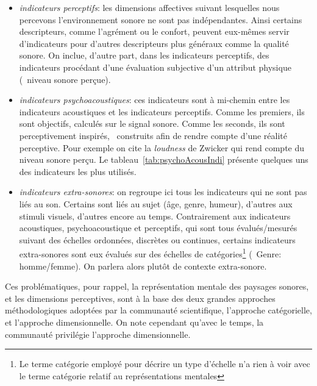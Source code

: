 \begin{itemize}
\begin{itemize}
\item \emph{indicateurs perceptifs}: les dimensions affectives suivant lesquelles nous percevons l'environnement sonore ne sont pas indépendantes. Ainsi certains descripteurs, comme l'agrément ou le confort, peuvent eux-mêmes servir d'indicateurs pour d'autres descripteurs plus généraux comme la qualité sonore. On inclue, d'autre part, dans les indicateurs perceptifs, des indicateurs procédant d'une évaluation subjective d'un attribut physique (\eg~niveau sonore perçue).

\item \emph{indicateurs psychoacoustiques}: ces indicateurs sont à mi-chemin entre les indicateurs acoustiques et les indicateurs perceptifs. Comme les premiers, ils sont objectifs, calculés sur le signal sonore. Comme les seconds, ils sont perceptivement inspirés, \ie~construits afin de rendre compte d'une réalité perceptive. Pour exemple on cite la \emph{loudness} de Zwicker \citep{zwicker2013psychoacoustics} qui rend compte du niveau sonore perçu. Le tableau~\ref{tab:psychoAcousIndi} présente quelques uns des indicateurs les plus utilisés.

\item \emph{indicateurs extra-sonores}: on regroupe ici tous les indicateurs qui ne sont pas liés au son. Certains sont liés au sujet (âge, genre, humeur), d'autres aux stimuli visuels, d'autres encore au temps. Contrairement aux indicateurs acoustiques, psychoacoustique et perceptifs, qui sont tous évalués/mesurés suivant des échelles ordonnées, discrètes ou continues, certains indicateurs extra-sonores sont eux évalués sur des échelles de catégories\footnote{Le terme catégorie employé pour décrire un type d'échelle n'a rien à voir avec le terme catégorie relatif au représentations mentales} (\eg~Genre: homme/femme). On parlera alors plutôt de contexte extra-sonore.
\end{itemize}

\end{itemize}

Ces problématiques, pour rappel, la représentation mentale des paysages sonores, et les dimensions perceptives, sont à la base des deux grandes approches méthodologiques adoptées par la communauté scientifique, l'approche catégorielle, et l'approche dimensionnelle. On note cependant qu'avec le temps, la communauté privilégie l'approche dimensionnelle. \\


